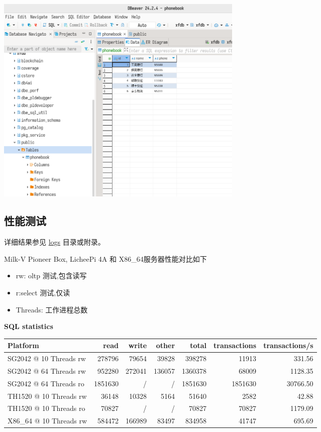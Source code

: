 \documentclass{article}
\begin{document}
\begin{center}
\includegraphics[width=12cm]{./image/6.png}
\end{center}

\subsection{性能测试}

详细结果参见 \href{https://github.com/QA-Team-lo/dbtest/tree/main/opengauss/logs}{logs} 目录或附录。

Milk-V Pioneer Box, LicheePi 4A 和 X86\_64服务器性能对比如下

\begin{itemize}
    \item rw: oltp 测试,包含读写 
    \item r:select 测试,仅读
    \item Threads: 工作进程总数
\end{itemize}

\textbf{SQL statistics}

\begin{table}[H]
\centering
\begin{tabular}{|l|r|r|r|r|r|r|}
\hline
Platform & read & write & other & total & transactions & transactions/s \\
\hline
SG2042 @ 10 Threads rw & 278796 & 79654 & 39828 & 398278 & 11913 & 331.56 \\
SG2042 @ 64 Threads rw & 952280 & 272041 & 136057 & 1360378 & 68009 & 1128.35 \\
SG2042 @ 64 Threads ro & 1851630 & / & / & 1851630 & 1851630 & 30766.50 \\
TH1520 @ 10 Threads rw & 36148 & 10328 & 5164 & 51640 & 2582 & 42.88 \\
TH1520 @ 10 Threads ro & 70827 & / & / & 70827 & 70827 & 1179.09 \\
X86\_64 @ 10 Threads rw & 584472 & 166989 & 83497 & 834958 & 41747 & 695.69 \\
\hline
\end{tabular}
\end{table}
\end{document}
